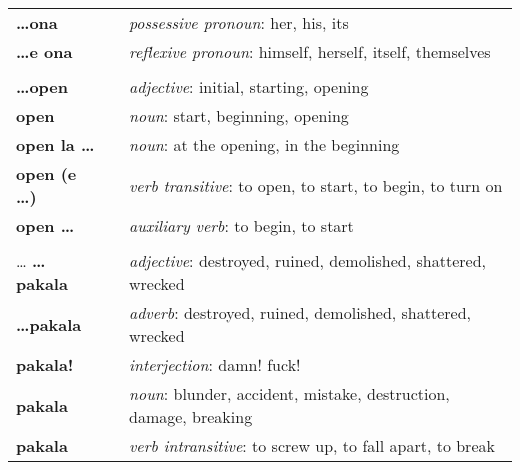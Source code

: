 \begin{supertabular}{p{2,5cm}|ll}
    \textbf{\dots ona}           &  & \textit{possessive pronoun}: her, his, its                                                                 \\
    \textbf{\dots e ona}         &  & \textit{reflexive pronoun}: himself, herself, itself, themselves                                           \\
                                 &  &                                                                                                            \\
    \textbf{\dots open}          &  & \textit{adjective}: initial, starting, opening                                                             \\
    \textbf{open}                &  & \textit{noun}: start, beginning, opening                                                                   \\
    \textbf{open la \dots}       &  & \textit{noun}: at the opening, in the beginning                                                            \\
    \textbf{open (e \dots)}      &  & \textit{verb transitive}: to open, to start, to begin, to turn on                                          \\
    \textbf{open \dots }         &  & \textit{auxiliary verb}: to begin, to start                                                                \\
                                 &  &                                                                                                            \\
    \dots
    \textbf{\dots pakala}        &  & \textit{adjective}: destroyed, ruined, demolished, shattered, wrecked                                      \\
    \textbf{\dots pakala}        &  & \textit{adverb}: destroyed, ruined, demolished, shattered, wrecked                                         \\
    \textbf{pakala!}             &  & \textit{interjection}: damn! fuck!                                                                         \\
    \textbf{pakala}              &  & \textit{noun}: blunder, accident, mistake, destruction, damage, breaking                                   \\
    \textbf{pakala}              &  & \textit{verb intransitive}: to screw up, to fall apart, to break                                           \\

\end{supertabular}
